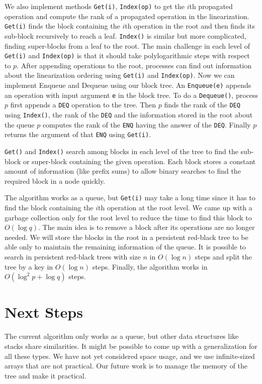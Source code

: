 \documentclass[12pt]{article}
\begin{document}
We also implement methods \texttt{Get(i)}, \texttt{Index(op)} to get the $i$th propagated operation and compute the rank of a propagated operation in the linearization. \texttt{Get(i)} finds the block containing the $i$th operation in the root and then finds its sub-block recursively to reach a leaf. \texttt{Index()} is  similar but more complicated, finding super-blocks from a leaf to the root. The main challenge in each level of \texttt{Get(i)} and \texttt{Index(op)} is that it should take polylogarithmic steps with respect to $p$. After appending operations to the root, processes can find out information about the linearization ordering using \texttt{Get(i)} and \texttt{Index(op)}. Now we can implement Enqueue and Dequeue using our block tree. An \texttt{Enqueue(e)} appends an operation with input argument \texttt{e} in the block tree. To do a \texttt{Dequeue()}, process $p$ first appends a \texttt{DEQ} operation to the tree. Then $p$ finds the rank of the \texttt{DEQ} using \texttt{Index()}, the rank of the \texttt{DEQ} and the information stored in the root about the queue $p$ computes the rank of  the \texttt{ENQ} having the answer of the \texttt{DEQ}. Finally $p$ returns the argument of that \texttt{ENQ} using \texttt{Get(i)}.

\texttt{Get()} and \texttt{Index()} search among blocks in each level of the tree to find the sub-block or super-block containing the given operation. Each block stores a constant amount of information (like prefix sums) to allow binary searches to find the required block in a node quickly.

The algorithm works as a queue, but \texttt{Get(i)}  may take a long time since it has to find the block containing the $i$th operation at the root level. We came up with a garbage collection only for the root level to reduce the time to find this block to $O(\log q)$. The main idea is to remove a block after its operations are no longer needed. We will store the blocks in the root in a persistent red-black tree to be able only to maintain the remaining information of the queue. It is possible to search in persistent red-black trees with size $n$ in $O(\log n)$ steps and split the tree by a key in $O(\log n)$ steps.  Finally, the algorithm works in $O(\log^2 p +\log q)$ steps.

\section{Next Steps}
The current algorithm only works as a queue, but other data structures like stacks share similarities. It might be possible to come up with a generalization for all these types. We have not yet considered space usage, and we use infinite-sized arrays that are not practical. Our future work is to manage the memory of the tree and make it practical.
\end{document}
